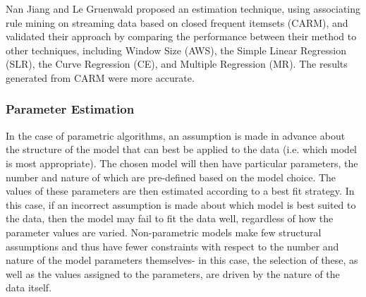 Nan Jiang and Le Gruenwald proposed an estimation technique, using associating rule mining on streaming data based on closed frequent itemsets (CARM), and validated their approach by comparing the performance between their method to other techniques, including Window Size (AWS), the Simple Linear Regression (SLR), the Curve Regression (CE), and Multiple Regression (MR). The results generated from CARM were more accurate.  

\subsubsection{Parameter Estimation}

In the case of parametric algorithms, an assumption is made in advance about the structure of the model that can best be applied to the data (i.e. which model is most appropriate). The chosen model will then have particular parameters, the number and nature of which are pre-defined based on the model choice. The values of these parameters are then estimated according to a best fit strategy. In this case, if an incorrect assumption is made about which model is best suited to the data, then the model may fail to fit the data well, regardless of how the parameter values are varied. Non-parametric models make few structural assumptions and thus have fewer constraints with respect to the number and nature of the model parameters themselves- in this case, the selection of these, as well as the values assigned to the parameters, are driven by the nature of the data itself.

